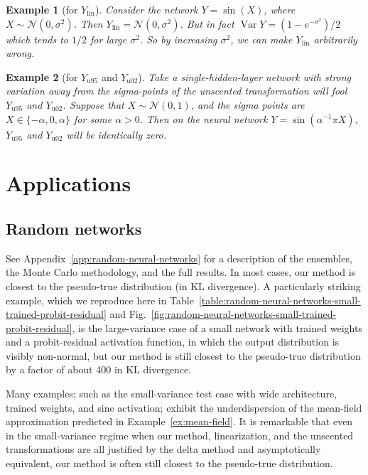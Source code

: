 \documentclass{article}
\newtheorem{example}{Example}
\DeclareMathOperator{\Var}{\operatorname{Var}}
\begin{document}
\begin{example}[for \(Y_\mathrm{lin}\)]
  Consider the network \(Y = \sin(X)\), where \(X \sim \mathcal N ({0, \sigma^2})\).
  Then \(Y_\mathrm{lin} = \mathcal{N}(0, \sigma^2)\).
  But in fact \(\Var Y = (1 - e^{-\sigma^2})/2\) which tends to \(1/2\) for large \(\sigma^2\).
  So by increasing \(\sigma^2\), we can make \(Y_\mathrm{lin}\) arbitrarily wrong.
\end{example}



\begin{example}[for \(Y_\mathrm{u95}\) and \(Y_\mathrm{u02}\)]
  Take a single-hidden-layer network with strong variation away from the sigma-points of the unscented transformation will fool \(Y_\mathrm{u95}\) and \(Y_\mathrm{u02}\).
  Suppose that \(X \sim \mathcal N(0, 1)\), and the sigma points are \(X \in \{-\alpha, 0, \alpha\}\) for some \(\alpha > 0\).
  Then on the neural network \(Y = \sin(\alpha^{-1}\pi X)\), \(Y_\mathrm{u95}\) and \(Y_\mathrm{u02}\) will be identically zero.
\end{example}


\section{Applications}
\subsection{Random networks}
\label{sec:random-networks}
See Appendix~\ref{app:random-neural-networks} for a description of the ensembles, the Monte Carlo methodology, and the full results.
In most cases, our method is closest to the pseudo-true distribution (in KL divergence).
A particularly striking example, which we reproduce here in Table~\ref{table:random-neural-networks-small-trained-probit-residual} and Fig.~\ref{fig:random-neural-networks-small-trained-probit-residual}, is the large-variance case of a small network with trained weights and a probit-residual activation function, in which the output distribution is visibly non-normal, but our method is still closest to the pseudo-true distribution by a factor of about 400 in KL divergence.

Many examples; such as the small-variance test case with wide architecture, trained weights, and sine activation; exhibit the underdispersion of the mean-field approximation predicted in Example~\ref{ex:mean-field}.
It is remarkable that even in the small-variance regime when our method, linearization, and the unscented transformations are all justified by the delta method and asymptotically equivalent, our method is often still closest to the pseudo-true distribution.
\end{document}
